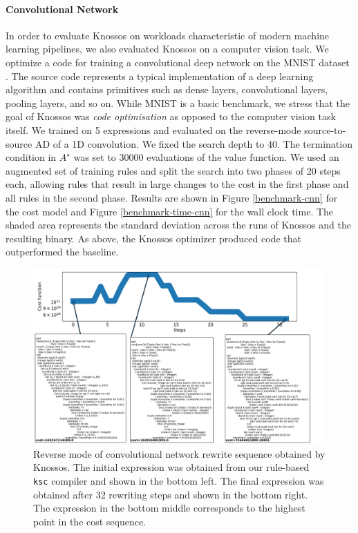 \documentclass[fullpage,twocolumn]{article} %
\begin{document}
\paragraph{Convolutional Network}
In order to evaluate Knossos on workloads characteristic of modern machine learning pipelines, we also evaluated Knossos on a computer vision task. We optimize a code for training a convolutional deep network on the MNIST dataset \citep{lecun1998mnist}. The source code represents a typical implementation of a deep learning algorithm and contains primitives such as dense layers, convolutional layers, pooling layers, and so on. While MNIST is a basic benchmark, we stress that the goal of Knossos was \emph{code optimisation} as opposed to the computer vision task itself. 
We trained on 5 expressions and evaluated on the reverse-mode source-to-source AD of a 1D convolution. 
We fixed the search depth to 40. The termination condition in $A^\star$ was set to 30000 evaluations of the value function.
We used an augmented set of training rules and split the search into two phases of 20 steps each, allowing rules that result in large changes to the cost in the first phase and all rules in the second phase.
Results are shown in Figure \ref{benchmark-cnn} for the cost model and Figure \ref{benchmark-time-cnn} for the wall clock time. The shaded area represents the standard deviation across the runs of Knossos and the resulting binary. As above, the Knossos optimizer produced code that outperformed the baseline.

\begin{figure}
  \centering
  \includegraphics[width=\textwidth]{cost_sequence_mnist.pdf}
  \caption{Reverse mode of convolutional network rewrite sequence obtained by Knossos. The initial expression was obtained from our rule-based \texttt{ksc} compiler and shown in the bottom left. The final expression was obtained after 32 rewriting steps and shown in the bottom right. The expression in the bottom middle corresponds to the highest point in the cost sequence.}
  \label{mnist-qualit}
\end{figure}
\end{document}
